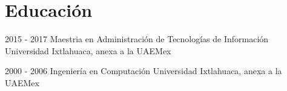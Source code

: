 \documentclass[]{friggeri-cv}
\begin{document}
\section{Educación}
\begin{entrylist}
  \entry
    {2015 - 2017}
    {Maestria en Administración de Tecnologías de Información}
    {Universidad Ixtlahuaca, anexa a la UAEMex\\}

  \entry
    {2000 - 2006}
    {Ingeniería en Computación}
    {Universidad Ixtlahuaca, anexa a la UAEMex\\}
    
\end{entrylist}
%


\end{document}
